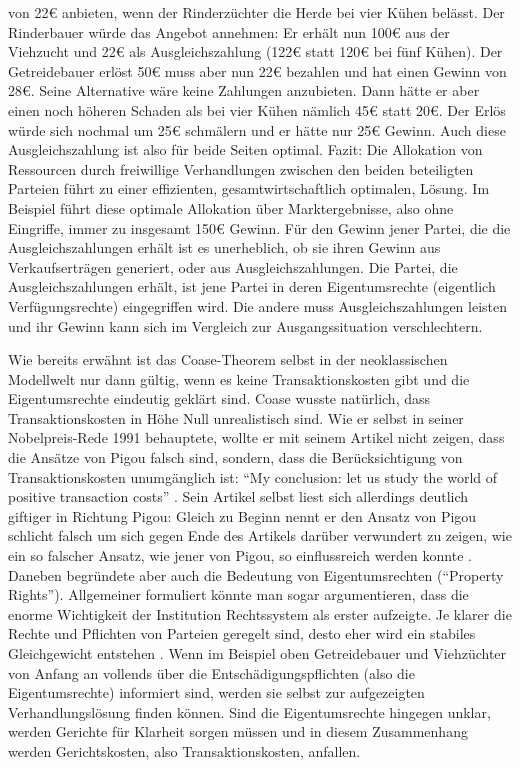 von 22€ anbieten, wenn der Rinderzüchter die Herde bei vier Kühen belässt. Der Rinderbauer würde das Angebot annehmen: Er erhält nun 100€ aus der Viehzucht und 22€ als Ausgleichszahlung (122€ statt 120€ bei fünf Kühen). Der Getreidebauer erlöst 50€ muss aber nun 22€ bezahlen und hat einen Gewinn von 28€. Seine Alternative wäre keine Zahlungen anzubieten. Dann hätte er aber einen noch höheren Schaden als bei vier Kühen nämlich 45€ statt 20€. Der Erlös würde sich nochmal um 25€ schmälern und er hätte nur 25€ Gewinn. Auch diese Ausgleichszahlung ist also für beide Seiten optimal. Fazit: Die Allokation von Ressourcen durch freiwillige Verhandlungen zwischen den beiden beteiligten Parteien führt zu einer effizienten, gesamtwirtschaftlich optimalen, Lösung.  Im Beispiel führt diese optimale Allokation über Marktergebnisse, also ohne Eingriffe, immer zu insgesamt 150€ Gewinn. Für den Gewinn jener Partei, die die Ausgleichszahlungen erhält ist es unerheblich, ob sie ihren Gewinn aus Verkaufserträgen generiert, oder aus Ausgleichszahlungen. Die Partei, die Ausgleichszahlungen erhält, ist jene Partei in deren Eigentumsrechte (eigentlich Verfügungsrechte) eingegriffen wird. Die andere muss Ausgleichszahlungen leisten und ihr Gewinn kann sich im Vergleich zur Ausgangssituation verschlechtern.

Wie bereits erwähnt ist das Coase-Theorem selbst in der neoklassischen Modellwelt nur dann gültig, wenn es keine Transaktionskosten gibt und die Eigentumsrechte eindeutig geklärt sind. Coase wusste natürlich, dass Transaktionskosten in Höhe Null unrealistisch sind. Wie er selbst in seiner Nobelpreis-Rede 1991 behauptete, wollte er mit seinem Artikel nicht zeigen, dass die Ansätze von Pigou falsch sind, sondern, dass die Berücksichtigung von Transaktionskosten unumgänglich ist: "`My conclusion: let us study the world of positive transaction costs"' \parencite{Coase1991}. Sein Artikel selbst liest sich allerdings deutlich giftiger \parencite[S. 243]{Cansier1989} in Richtung Pigou: Gleich zu Beginn nennt er den Ansatz von Pigou schlicht falsch \parencite[S. 2]{Coase1960} um sich gegen Ende des Artikels darüber verwundert zu zeigen, wie ein so falscher Ansatz, wie jener von Pigou, so einflussreich werden konnte \parencite[S. 39]{Coase1960}. Daneben begründete \textcite{Coase1960} aber auch die Bedeutung von Eigentumsrechten ("`Property Rights"').  Allgemeiner formuliert könnte man sogar argumentieren, dass \textcite{Coase1960} die enorme Wichtigkeit der Institution Rechtssystem als erster aufzeigte. Je klarer die Rechte und Pflichten von Parteien geregelt sind, desto eher wird ein stabiles Gleichgewicht entstehen \parencite[S. 19]{Coase1960}. Wenn im Beispiel oben Getreidebauer und Viehzüchter von Anfang an vollends über die Entschädigungspflichten (also die Eigentumsrechte) informiert sind, werden sie selbst zur aufgezeigten Verhandlungslösung finden können. Sind die Eigentumsrechte hingegen unklar, werden Gerichte für Klarheit sorgen müssen und in diesem Zusammenhang werden Gerichtskosten, also Transaktionskosten, anfallen. 

